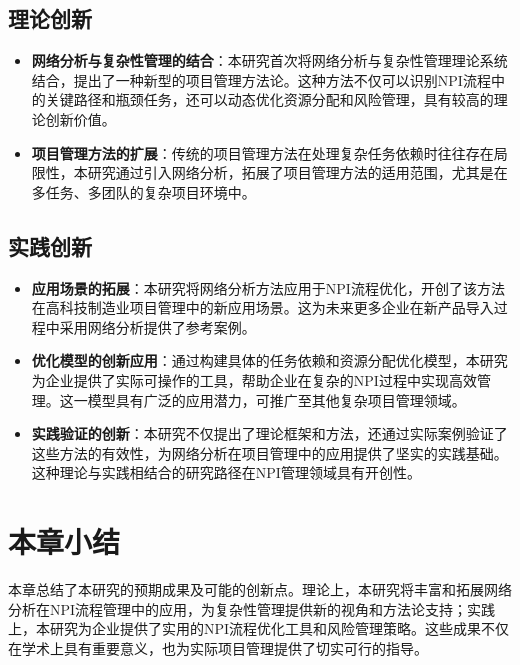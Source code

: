 \subsection{理论创新}
\begin{itemize}
    \item \textbf{网络分析与复杂性管理的结合}：本研究首次将网络分析与复杂性管理理论系统结合，提出了一种新型的项目管理方法论。这种方法不仅可以识别NPI流程中的关键路径和瓶颈任务，还可以动态优化资源分配和风险管理，具有较高的理论创新价值。
    \item \textbf{项目管理方法的扩展}：传统的项目管理方法在处理复杂任务依赖时往往存在局限性，本研究通过引入网络分析，拓展了项目管理方法的适用范围，尤其是在多任务、多团队的复杂项目环境中。
\end{itemize}

\subsection{实践创新}
\begin{itemize}
    \item \textbf{应用场景的拓展}：本研究将网络分析方法应用于NPI流程优化，开创了该方法在高科技制造业项目管理中的新应用场景。这为未来更多企业在新产品导入过程中采用网络分析提供了参考案例。
    \item \textbf{优化模型的创新应用}：通过构建具体的任务依赖和资源分配优化模型，本研究为企业提供了实际可操作的工具，帮助企业在复杂的NPI过程中实现高效管理。这一模型具有广泛的应用潜力，可推广至其他复杂项目管理领域。
    \item \textbf{实践验证的创新}：本研究不仅提出了理论框架和方法，还通过实际案例验证了这些方法的有效性，为网络分析在项目管理中的应用提供了坚实的实践基础。这种理论与实践相结合的研究路径在NPI管理领域具有开创性。
\end{itemize}

\section{本章小结}
本章总结了本研究的预期成果及可能的创新点。理论上，本研究将丰富和拓展网络分析在NPI流程管理中的应用，为复杂性管理提供新的视角和方法论支持；实践上，本研究为企业提供了实用的NPI流程优化工具和风险管理策略。这些成果不仅在学术上具有重要意义，也为实际项目管理提供了切实可行的指导。

